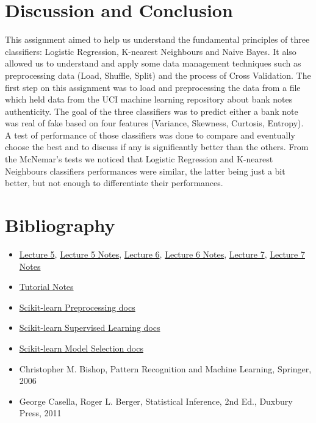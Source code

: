 \documentclass[a4paper]{article}
\begin{document}
\section{Discussion and Conclusion}
This assignment aimed to help us understand the fundamental principles of three 
classifiers: Logistic Regression, K-nearest Neighbours and Naive Bayes. 
It also allowed us to understand and apply some data management techniques 
such as preprocessing data (Load, Shuffle, Split) and the process of Cross Validation. 
The first step on this assignment was to load and preprocessing the data from a 
file which held data from the UCI machine learning repository about bank notes 
authenticity. The goal of the three classifiers was to predict either a bank note 
was real of fake based on four features (Variance, Skewness, Curtosis, Entropy).
A test of performance of those classifiers was done to compare and eventually 
choose the best and to discuss if any is significantly better than the others. 
From the McNemar's tests we noticed that Logistic Regression and K-nearest 
Neighbours classifiers performances were similar, the latter being just 
a bit better, but not enough to differentiate their performances.
  

\section{Bibliography}
\begin{itemize}
\item \href{http://aa.ssdi.di.fct.unl.pt/files/AA-05.pdf}{Lecture 5}, 
	\href{http://aa.ssdi.di.fct.unl.pt/files/AA-05_notes.pdf}{Lecture 5 Notes}, 
	\href{http://aa.ssdi.di.fct.unl.pt/files/AA-06.pdf}{Lecture 6}, 
	\href{http://aa.ssdi.di.fct.unl.pt/files/AA-06_notes.pdf}{Lecture 6 Notes}, 
	\href{http://aa.ssdi.di.fct.unl.pt/files/AA-07.pdf}{Lecture 7}, 
	\href{http://aa.ssdi.di.fct.unl.pt/files/AA-07_notes.pdf}{Lecture 7 Notes}\\
\item \href{http://aa.ssdi.di.fct.unl.pt/files/Tutorials.pdf}{Tutorial Notes}\\
\item \href{http://scikit-learn.org/stable/modules/preprocessing.html#preprocessing}{Scikit-learn Preprocessing docs}\\
\item \href{http://scikit-learn.org/stable/supervised_learning.html#supervised-learning}{Scikit-learn Supervised Learning docs}\\
\item \href{http://scikit-learn.org/stable/model_selection.html#model-selection}{Scikit-learn Model Selection docs}\\
\item Christopher M. Bishop, Pattern Recognition and Machine Learning, Springer, 2006
\item George Casella, Roger L. Berger, Statistical Inference, 2nd Ed., Duxbury Press, 2011
\end{itemize}
\end{document}
